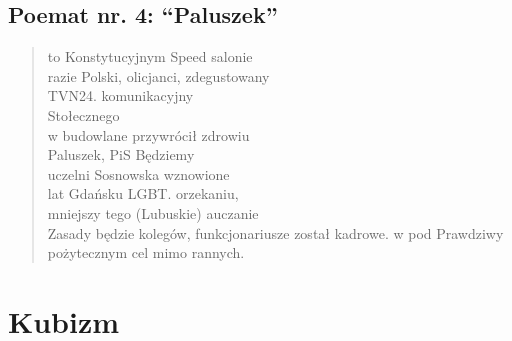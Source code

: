 \documentclass[a4paper]{article}
\begin{document}
\subsection{Poemat nr. 4: ``Paluszek''}
\begin{quote}
to Konstytucyjnym Speed salonie \\
razie Polski, olicjanci, zdegustowany \\
TVN24. komunikacyjny \\
Stołecznego \\
w budowlane przywrócił zdrowiu \\
Paluszek, PiS Będziemy \\
uczelni Sosnowska wznowione \\
lat Gdańsku LGBT. orzekaniu, \\
mniejszy tego (Lubuskie) auczanie \\
Zasady będzie kolegów, funkcjonariusze został kadrowe. w pod Prawdziwy pożytecznym cel mimo rannych.\\
\end{quote}
\section{Kubizm}
\end{document}
